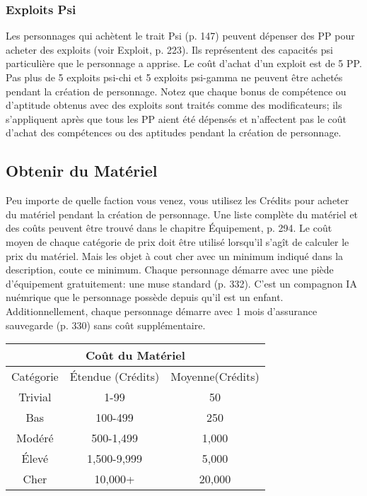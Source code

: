 \subsubsection{Exploits Psi} \label{sec:purchasing-psi-sleights} 

Les personnages qui achètent le trait Psi (p. 147) peuvent dépenser des PP pour acheter des exploits (voir Exploit, p. 223). Ils représentent des capacités psi particulière que le personnage a apprise. Le coût d'achat d'un exploit est de 5 PP. Pas plus de 5 exploits psi-chi et 5 exploits psi-gamma ne peuvent être achetés pendant la création de personnage. Notez que chaque bonus de compétence ou d'aptitude obtenus avec des exploits sont traités comme des modificateurs; ils s'appliquent après que tous les PP aient été dépensés et n'affectent pas le coût d'achat des compétences ou des aptitudes pendant la création de personnage. 

\subsection{Obtenir du Matériel} \label{sec:purchase-gear} 

Peu importe de quelle faction vous venez, vous utilisez les Crédits pour acheter du matériel pendant la création de personnage. Une liste complète du matériel et des coûts peuvent être trouvé dans le chapitre Équipement, p. 294. Le coût moyen de chaque catégorie de prix doit être utilisé lorsqu'il s'agît de calculer le prix du matériel. Mais les objet à cout cher avec un minimum indiqué dans la description, coute ce minimum. Chaque personnage démarre avec une piède d'équipement gratuitement: une muse standard (p. 332). C'est un compagnon IA nuémrique que le personnage possède depuis qu'il est un enfant. Additionnellement, chaque personnage démarre avec 1 mois d'assurance sauvegarde (p. 330) sans coût supplémentaire. 

\begin{center} \begin{tabular}{|c|c|c|} \hline

\multicolumn{3}{|c|}{Coût du Matériel} \\ \hline

Catégorie &Étendue (Crédits) &Moyenne(Crédits)\\ \hline

Trivial &1-99 &50\\ \hline

Bas &100-499 &250\\ \hline

Modéré &500-1,499 &1,000\\ \hline

Élevé &1,500-9,999 &5,000\\ \hline

Cher &10,000+ &20,000\\ \hline \end{tabular} \end{center} 


